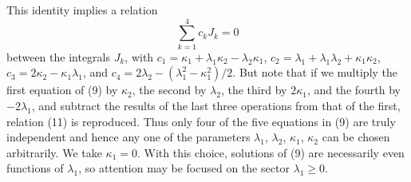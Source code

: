This identity implies a relation 
\begin{equation}
  \sum_{k=1}^4 c_kJ_k=0
\end{equation}
between the integrals $J_k$,
with $c_1=\kappa_1+\lambda_1\kappa_2- \lambda_2\kappa_1$, 
$c_2=\lambda_1+\lambda_1\lambda_2+\kappa_1\kappa_2$, 
$c_3=2\kappa_2-\kappa_1\lambda_1$, and 
$c_4=2\lambda_2-(\lambda_1^2-\kappa_1^2)/2$.
But note that if we multiply the first equation of (9) 
by $\kappa_2$, the second by $\lambda_2$, the third by $2\kappa_1$, 
and the fourth by $-2\lambda_1$, and subtract the results of the last
three operations from that of the first, relation (11) is reproduced.
Thus only four of the five equations in (9) are truly independent and 
hence any one of the parameters 
$\lambda_1$, $\lambda_2$, $\kappa_1$, $\kappa_2$ 
can be chosen arbitrarily.  We take $\kappa_1=0$.  
With this choice, solutions of (9) are necessarily even functions of 
$\lambda_1$, so attention may be focused on the sector $\lambda_1\geq 0$. 

